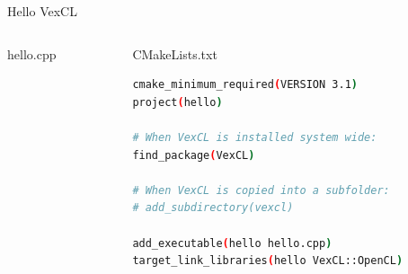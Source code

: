 \documentclass[@BEAMER_OPTIONS@]{beamer}
\begin{document}
\begin{frame}[fragile]{Hello VexCL}
    \vspace{-1\baselineskip}
    \begin{columns}
        \begin{column}[t]{0.5\textwidth}
            \begin{exampleblock}{hello.cpp}
                \begin{adjustbox}{width=0.9\textwidth, height=\textheight, keepaspectratio}
                    \begin{minipage}{\textwidth}
                        
                    \end{minipage}
                \end{adjustbox}
            \end{exampleblock}
        \end{column}
        \begin{column}[t]{0.45\textwidth}
            \begin{exampleblock}{CMakeLists.txt}
                \begin{adjustbox}{width=0.9\textwidth, height=\textheight, keepaspectratio}
                    \begin{minipage}{\textwidth}
                        \begin{lstlisting}[language=sh,
                        morekeywords={cmake_minimum_required,project,find_package,add_subdirectory,add_executable,target_link_libraries}]
cmake_minimum_required(VERSION 3.1)
project(hello)

# When VexCL is installed system wide:
find_package(VexCL)

# When VexCL is copied into a subfolder:
# add_subdirectory(vexcl)

add_executable(hello hello.cpp)
target_link_libraries(hello VexCL::OpenCL)
                        \end{lstlisting}
                    \end{minipage}
                \end{adjustbox}
            \end{exampleblock}
        \end{column}
    \end{columns}
\end{frame}
\end{document}
